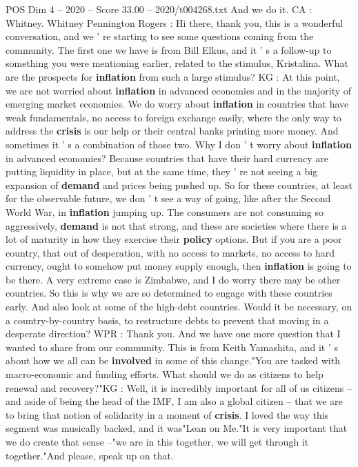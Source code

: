 \begin{textsample}{POS Dim 4 – 2020 – Score 33.00 – 2020/t004268.txt}
And we do it.
CA : Whitney.
Whitney Pennington Rogers : Hi there, thank you, this is a wonderful conversation, and we ' re starting to see some questions coming from the community.
The first one we have is from Bill Elkus, and it ' s a follow-up to something you were mentioning earlier, related to the stimulus, Kristalina.
What are the prospects for \textbf{inflation} from such a large stimulus?
KG : At this point, we are not worried about \textbf{inflation} in advanced economies and in the majority of emerging market economies.
We do worry about \textbf{inflation} in countries that have weak fundamentals, no access to foreign exchange easily, where the only way to address the \textbf{crisis} is our help or their central banks printing more money.
And sometimes it ' s a combination of those two.
Why I don ' t worry about \textbf{inflation} in advanced economies?
Because countries that have their hard currency are putting liquidity in place, but at the same time, they ' re not seeing a big expansion of \textbf{demand} and prices being pushed up.
So for these countries, at least for the observable future, we don ' t see a way of going, like after the Second World War, in \textbf{inflation} jumping up.
The consumers are not consuming so aggressively, \textbf{demand} is not that strong, and these are societies where there is a lot of maturity in how they exercise their \textbf{policy} options.
But if you are a poor country, that out of desperation, with no access to markets, no access to hard currency, ought to somehow put money supply enough, then \textbf{inflation} is going to be there.
A very extreme case is Zimbabwe, and I do worry there may be other countries.
So this is why we are so determined to engage with these countries early.
And also look at some of the high-debt countries.
Would it be necessary, on a country-by-country basis, to restructure debts to prevent that moving in a desperate direction?
WPR : Thank you.
And we have one more question that I wanted to share from our community.
This is from Keith Yamashita, and it ' s about how we all can be \textbf{involved} in some of this change."You are tasked with macro-economic and funding efforts.
What should we do as citizens to help renewal and recovery?"KG : Well, it is incredibly important for all of us citizens -- and aside of being the head of the IMF, I am also a global citizen -- that we are to bring that notion of solidarity in a moment of \textbf{crisis}.
I loved the way this segment was musically backed, and it was"Lean on Me."It is very important that we do create that sense --"we are in this together, we will get through it together."And please, speak up on that.

\end{textsample}
